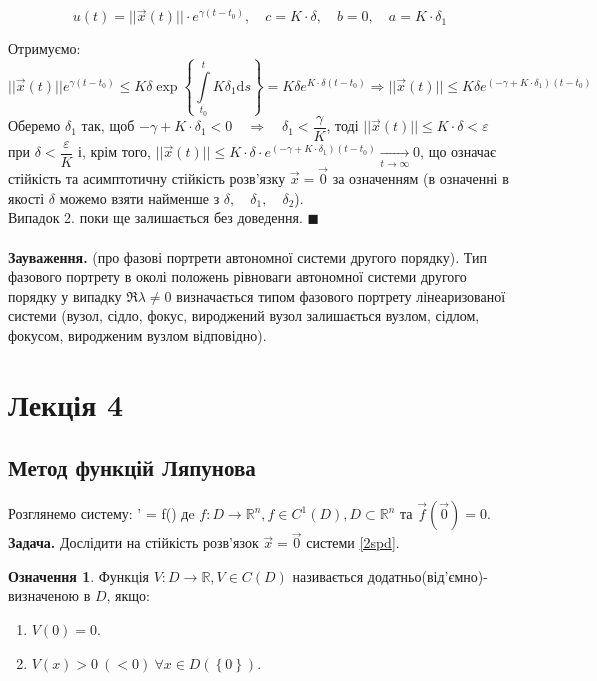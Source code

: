 \documentclass[14pt,a4paper]{scrartcl}
\theoremstyle{definition}
\newtheorem*{defo}{Означення}
\theoremstyle{definition}
\theoremstyle{definition}
\begin{document}
$$ u(t) = ||\overrightarrow{x}(t)|| \cdot e^{\gamma(t - t_0)}, \quad c = K \cdot \delta, \quad b = 0, \quad a = K \cdot \delta_1$$

Отримуємо: $$||\overrightarrow{x}(t)|| e^{\gamma(t - t_0)} \!\leq\! K \delta \exp \left\lbrace {\int\limits_{t_0}^{t} K \delta_1 \mathrm{d}s} \right\rbrace \!=\! K \delta e^{K \cdot \delta (t - t_0)} \!\Rightarrow\! ||\overrightarrow{x}(t)|| \!\leq\! K \delta e^{(-\gamma + K \cdot \delta_1)(t - t_0)}$$ Оберемо $\delta_1$ так, щоб $-\gamma + K \cdot \delta_1 < 0 \quad \Longrightarrow \quad \delta_1 < \dfrac{\gamma}{K}$, тоді $||\overrightarrow{x}(t)|| \leq K \cdot \delta < \varepsilon$ при $\delta < \dfrac{\varepsilon}{K}$ і, крім того, $||\overrightarrow{x}(t)|| \leq K \cdot \delta \cdot e^{(-\gamma + K \cdot \delta_1)(t - t_0)} \xrightarrow[t \to \infty]{} 0$, що означає стійкість та асимптотичну стійкість розв'язку $\overrightarrow{x} = \overrightarrow{0}$ за означенням (в означенні в якості $\delta$ можемо взяти найменше з $\delta, \quad \delta_1, \quad \delta_2$).\\ Випадок 2. поки ще залишається без доведення. $\blacksquare$ \\ \\
\textbf{Зауваження.} (про фазові портрети автономної системи другого порядку). Тип фазового портрету в околі положень рівноваги автономної системи другого порядку у випадку $\Re \lambda \neq 0$ визначається типом фазового портрету лінеаризованої системи (вузол, сідло, фокус, вироджений вузол залишається вузлом, сідлом, фокусом, виродженим вузлом відповідно). \\

\section{Лекція 4}
\subsection{Метод функцій Ляпунова}
Розглянемо систему:
\be \label{2spd}
 ' = f()
\ee
дe $f: D \to \mathbb{R}^n, f\in C^{1} \left( D \right), D \subset \mathbb{R}^n $ та $\overrightarrow{f} ( \overrightarrow{0}) = 0$. \textbf{Задача. } Дослідити на стійкість розв'язок $ \overrightarrow{x} = \overrightarrow{0}$ системи \eqref{2spd}.
 \begin{defo}
  Функція $V : D \to \mathbb{R}, V \in C(D) $ називається додатньо(від'ємно)-визначеною в $D$, якщо:
\begin{enumerate}
  \item $V(0) = 0$.
  \item $V(x) > 0 \ (<0) \ \forall x \in D(\left\lbrace 0 \right\rbrace)$.
\end{enumerate}
 \end{defo}
\end{document}
